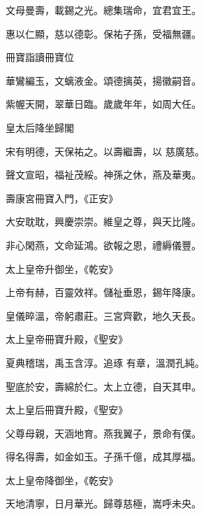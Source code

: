 \begin{pinyinscope}
 文母曼壽，載錫之光。總集瑞命，宜君宜王。



 惠以仁顯，慈以德彰。保祐子孫，受福無疆。



 冊寶詣讀冊寶位



 華鸞編玉，文螭液金。頌德摛英，揚徽嗣音。



 紫幄天開，翠華日臨。歲歲年年，如周大任。



 皇太后降坐歸閣



 宋有明德，天保祐之。以壽繼壽，以
 慈廣慈。



 聲文宣昭，福祉茂綏。神孫之休，燕及華夷。



 壽康宮冊寶入門，《正安》



 大安耽耽，興慶崇崇。維皇之尊，與天比隆。



 非心閑燕，文命延鴻。欲報之恩，禮縟儀豐。



 太上皇帝升御坐，《乾安》



 上帝有赫，百靈效祥。儲祉垂恩，錫年降康。



 皇儀晬溫，帝躬肅莊。三宮齊歡，地久天長。



 太上皇帝冊寶升殿，《聖安》



 夏典稽瑞，禹玉含淳。追琢
 有章，溫潤孔純。



 聖底於安，壽綿於仁。太上立德，自天其申。



 太上皇后冊寶升殿，《聖安》



 父尊母親，天涵地育。燕我翼子，景命有僕。



 得名得壽，如金如玉。子孫千億，成其厚福。



 太上皇帝降御坐，《乾安》



 天地清寧，日月華光。歸尊慈極，嵩呼未央。




\end{pinyinscope}
